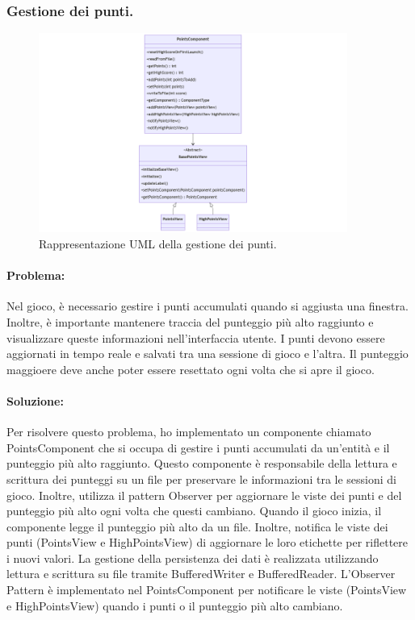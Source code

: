 \documentclass[a4paper,12pt]{report}
\begin{document}
\subsubsection{Gestione dei punti.}

\begin{figure}[H]
\centering{}
\includegraphics[width=0.9\textwidth]{img/points.png}
\caption{Rappresentazione UML della gestione dei punti.}
\end{figure}

\paragraph{Problema:}
Nel gioco, è necessario gestire i punti accumulati quando si aggiusta una finestra. 
Inoltre, è importante mantenere traccia del punteggio più alto raggiunto e visualizzare queste informazioni nell'interfaccia utente. 
I punti devono essere aggiornati in tempo reale e salvati tra una sessione di gioco e l'altra. 
Il punteggio maggioere deve anche poter essere resettato ogni volta che si apre il gioco.

\paragraph{Soluzione:}
Per risolvere questo problema, ho implementato un componente chiamato PointsComponent che si occupa di gestire i punti accumulati da un'entità e il punteggio più alto raggiunto. 
Questo componente è responsabile della lettura e scrittura dei punteggi su un file per preservare le informazioni tra le sessioni di gioco. 
Inoltre, utilizza il pattern Observer per aggiornare le viste dei punti e del punteggio più alto ogni volta che questi cambiano. 
Quando il gioco inizia, il componente legge il punteggio più alto da un file. 
Inoltre, notifica le viste dei punti (PointsView e HighPointsView) di aggiornare le loro etichette per riflettere i nuovi valori. 
La gestione della persistenza dei dati è realizzata utilizzando lettura e scrittura su file tramite BufferedWriter e BufferedReader. 
L'Observer Pattern è implementato nel PointsComponent per notificare le viste (PointsView e HighPointsView) quando i punti o il punteggio più alto cambiano. 
\end{document}
